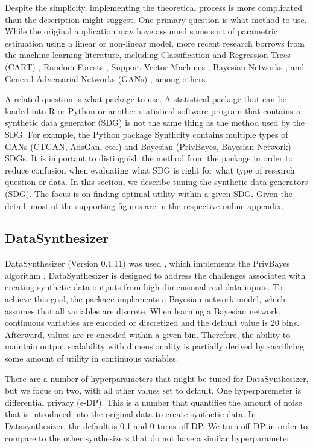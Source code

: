 \documentclass[runningheads]{llncs}
\begin{document}
Despite the simplicity, implementing the theoretical process is more complicated than the description might suggest.  One primary question is what method to use.  While the original application may have assumed some sort of parametric estimation using a linear or non-linear model, more recent research borrows from the machine learning literature, including Classification and Regression Trees (CART) \cite{reiter2005using}, Random Forests \cite{caiola2010random}, Support Vector Machines \cite{drechsler2010using}, Bayesian Networks \cite{zhang2017privbayes}, and General Adversarial Networks (GANs) \cite{goodfellow2014generative}, among others.  

A related question is what package to use.  A statistical package that can be loaded into R or Python or another statistical software program that contains a synthetic data generator (SDG) is not the same thing as the method used by the SDG.  For example, the Python package Synthcity \cite{synthcity} contains multiple types of GANs (CTGAN, AdsGan, etc.) and Bayesian (PrivBayes, Bayesian Network) SDGs.  It is important to distinguish the method from the package in order to reduce confusion when evaluating what SDG is right for what type of research question or data.  In this section, we describe tuning the synthetic data generators (SDG).  The focus is on finding optimal utility within a given SDG.  Given the detail, most of the supporting figures are in the respective online appendix.  

\subsection{DataSynthesizer} 

DataSynthesizer (Version 0.1.11) was used \cite{ping2017datasynthesizer}, which implements the PrivBayes algorithm \cite{zhang2017privbayes}.  DataSynthesizer is designed to address the challenges associated with creating synthetic data outputs from high-dimensional real data inputs.  To achieve this goal, the package implements a Bayesian network model, which assumes that all variables are discrete.   When learning a Bayesian network, continuous variables are encoded or discretized and the default value is 20 bins.  Afterward, values are re-encoded within a given bin.  Therefore, the ability to maintain output scalability with dimensionality is partially derived by sacrificing some amount of utility in continuous variables.   

There are a number of hyperparameters that might be tuned for DataSynthesizer, but we focus on two, with all other values set to default.  One hyperparemeter is differential privacy ($\epsilon$-DP). This is a number that quantifies the amount of noise that is introduced into the original data to create synthetic data.  In Datasynthesizer, the default is 0.1 and 0 turns off DP.  We turn off DP in order to compare to the other synthesizers that do not have a similar hyperparameter.  
\end{document}
